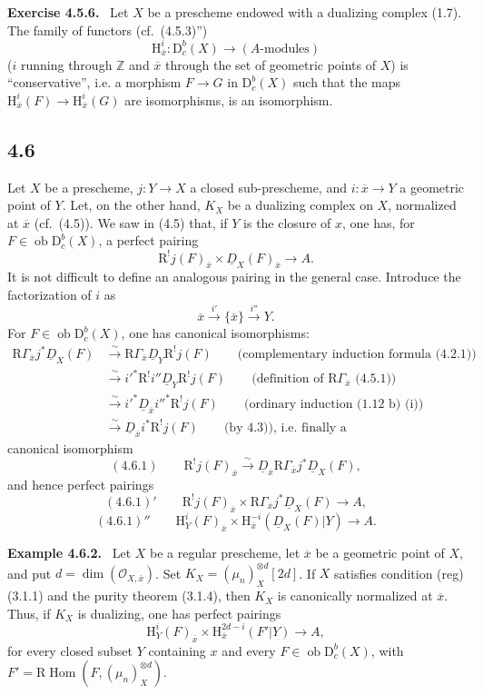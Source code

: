 \documentclass[11pt]{article}
\providecommand{\cO}{\mathcal{O}}
\newenvironment{statement}[1]{\par\medskip\noindent\textbf{#1.}\ }{\par\medskip}
\renewcommand{\H}{\mathrm{H}}
\DeclareMathOperator{\Hom}{Hom}
\newcommand{\R}{\mathrm{R}}
\newcommand{\D}{\mathrm{D}}
\newcommand{\Z}{\mathbb{Z}}
\newcommand{\ob}{\operatorname{ob}}
\newcommand{\ol}[1]{\overline{#1}}
\providecommand{\Hom}{\operatorname{Hom}}
\providecommand{\ob}{\operatorname{ob}}
\providecommand{\R}{\mathrm R}
\providecommand{\Z}{\mathbb Z}
\begin{document}
\begin{statement}{Exercise 4.5.6}
Let $X$ be a prescheme endowed with a dualizing complex (1.7). The family of functors (cf.~(4.5.3)'')
\[
\H_{\ol{x}}^i:\D_c^b(X)\longrightarrow (A\text{-modules})
\]
($i$ running through $\Z$ and $\ol{x}$ through the set of geometric points of $X$) is ``conservative'', i.e. a morphism $F\to G$ in $\D_c^b(X)$ such that the maps $\H_{\ol{x}}^i(F)\to\H_{\ol{x}}^i(G)$ are isomorphisms, is an isomorphism.
\end{statement}

\subsection*{4.6}
Let $X$ be a prescheme, $j:Y\to X$ a closed sub-prescheme, and $i:\ol{x}\to Y$ a geometric point of $Y$. Let, on the other hand, $K_X$ be a dualizing complex on $X$, normalized at $\ol{x}$ (cf.~(4.5)). We saw in (4.5) that, if $Y$ is the closure of $x$, one has, for $F\in\ob\D_c^b(X)$, a perfect pairing
\[
\R^{!}j(F)_{\ol{x}}\times \underline{D}_X(F)_{\ol{x}}\longrightarrow A.
\]
It is not difficult to define an analogous pairing in the general case. Introduce the factorization of $i$ as
\[
\ol{x}\xrightarrow{i'}\{\ol{x}\}\xrightarrow{i''}Y.
\]
For $F\in\ob\D_c^b(X)$, one has canonical isomorphisms:
\[
\begin{aligned}
\R\Gamma_{\ol{x}}j^*\underline{D}_X(F)&\xrightarrow{\sim}\R\Gamma_{\ol{x}}\underline{D}_Y\R^{!}j(F)\qquad\text{(complementary induction formula (4.2.1))}\\
&\xrightarrow{\sim}i'^*\R^{!}i''\underline{D}_Y\R^{!}j(F)\qquad\text{(definition of $\R\Gamma_{\ol{x}}$ (4.5.1))}\\
&\xrightarrow{\sim}i'^*\underline{D}_{\ol{x}}i''^*\R^{!}j(F)\qquad\text{(ordinary induction (1.12 b) (i))}\\
&\xrightarrow{\sim}\underline{D}_{\ol{x}}i^*\R^{!}j(F)\qquad\text{(by 4.3)), i.e. finally a}
\end{aligned}
\]
canonical isomorphism
\[
(4.6.1)\qquad \R^{!}j(F)_{\ol{x}}\xrightarrow{\sim}\underline{D}_{\ol{x}}\R\Gamma_{\ol{x}}j^*\underline{D}_X(F),
\]
and hence perfect pairings
\[
(4.6.1)'\qquad \R^{!}j(F)_{\ol{x}}\times \R\Gamma_{\ol{x}}j^*\underline{D}_X(F)\longrightarrow A,
\]
\[
(4.6.1)''\qquad \H_Y^i(F)_{\ol{x}}\times \H_{\ol{x}}^{-i}(\underline{D}_X(F)|Y)\longrightarrow A.
\]

\begin{statement}{Example 4.6.2}
Let $X$ be a regular prescheme, let $\ol{x}$ be a geometric point of $X$, and put $d=\dim(\cO_{X,\ol{x}})$. Set $K_X=(\mu_n)_X^{\otimes d}[2d]$. If $X$ satisfies condition (reg) (3.1.1) and the purity theorem (3.1.4), then $K_X$ is canonically normalized at $\ol{x}$. Thus, if $K_X$ is dualizing, one has perfect pairings
\[
\H_Y^i(F)_{\ol{x}}\times \H_{\ol{x}}^{2d-i}(F'|Y)\longrightarrow A,
\]
for every closed subset $Y$ containing $x$ and every $F\in\ob\D_c^b(X)$, with $F'=\R\Hom(F,(\mu_n)_X^{\otimes d})$.
\end{statement}
\end{document}
